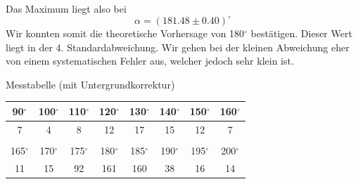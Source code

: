 Das Maximum liegt also bei
$$\alpha = (181.48 \pm 0.40)^\circ$$
Wir konnten somit die theoretische Vorhersage von 180$^\circ$ bestätigen. Dieser Wert liegt in der 4. Standardabweichung. Wir gehen bei der kleinen Abweichung eher von einem systematischen Fehler aus, welcher jedoch sehr klein ist.

Messtabelle (mit Untergrundkorrektur)

\begin{center}
\begin{tabular}{c c c c c c c c}
90$^\circ$ & 100$^\circ$ & 110$^\circ$ & 120$^\circ$ & 130$^\circ$ & 140$^\circ$ & 150$^\circ$ & 160$^\circ$\\ \hline
7 & 4 & 8 & 12 & 17 & 15 & 12 & 7 \\
& & & & & & & \\
165$^\circ$ & 170$^\circ$ & 175$^\circ$ & 180$^\circ$ & 185$^\circ$ & 190$^\circ$ & 195$^\circ$ & 200$^\circ$\\ \hline
11 & 15 & 92 & 161 & 160 & 38 & 16 & 14\\
\end{tabular}
\end{center}

